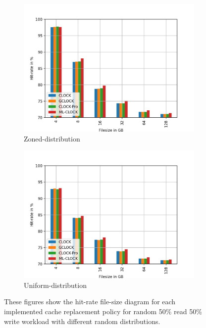 \documentclass[
	12pt,
	a4paper,
	abstract,
	bibliography=totoc,
	chapterprefix,
	headings=openright,
	numbers=endperiod,
	parskip=half,
	twoside,
]{scrreprt}
\begin{document}
\begin{figure}[H]
\begin{subfigure}{0.4\textwidth}
		\includegraphics[width=\textwidth]{rw_50to50_zoned.jpg}		
		\caption{Zoned-distribution}
		\label{fig:rw_90to10  zoned}
	\end{subfigure}
	\hfill
	\begin{subfigure}{0.4\textwidth}
		\includegraphics[width=\textwidth]{rw_50to50_uniform.jpg}		
		\caption{Uniform-distribution}
		\label{fig:rw_90to10  uniform}
	\end{subfigure}
	\caption{These figures show the hit-rate file-size diagram for each implemented 		cache replacement policy for random 50\% read 50\% write workload with different random distributions.}
	\label{fig:single 50p read}
\end{figure}
\end{document}
